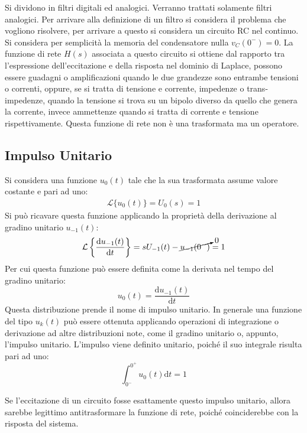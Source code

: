 \documentclass{article}
\newcommand{\df}{\mathrm{d}}
\numberwithin{equation}{subsection}
\begin{document}
Si dividono in filtri digitali ed analogici. Verranno trattati solamente filtri analogici.  
Per arrivare alla definizione di un filtro si considera il problema che vogliono risolvere, per arrivare a questo si considera un circuito RC nel continuo. 
Si considera per semplicità la memoria del condensatore nulla $v_C(0^-)=0$. 
La funzione di rete $H(s)$ associata a questo circuito si ottiene dal rapporto tra l'espressione dell'eccitazione e della risposta nel dominio di Laplace, possono essere 
guadagni o amplificazioni quando le due grandezze sono entrambe tensioni o correnti, oppure, se si tratta di tensione e corrente, impedenze o trans-impedenze, quando la tensione si trova su un bipolo diverso 
da quello che genera la corrente, invece ammettenze quando si tratta di corrente e tensione rispettivamente. 
Questa funzione di rete non è una trasformata ma un operatore. 

\subsection{Impulso Unitario}

Si considera una funzione $u_0(t)$ tale che la sua trasformata assume valore costante e pari ad uno:
\begin{gather}
    \mathcal{L}\{u_0(t)\}=U_0(s)=1
\end{gather}
Si può ricavare questa funzione applicando la proprietà della derivazione al gradino unitario $u_{-1}(t)$:
\begin{gather*}
    \mathcal{L}\left\{\displaystyle\frac{\df u_{-1}(t)}{\df t}\right\}=sU_{-1}(t)-\cancelto{0}{u_{-1}(0^-)}=1
\end{gather*}
Per cui questa funzione può essere definita come la derivata nel tempo del gradino unitario:
\begin{equation}
    u_0(t)=\displaystyle\frac{\df u_{-1}(t)}{\df t}
\end{equation}
Questa distribuzione prende il nome di impulso unitario. In generale una funzione del tipo $u_{k}(t)$ può essere ottenuta applicando operazioni di integrazione o derivazione 
ad altre distribuzioni note, come il gradino unitario o, appunto, l'impulso unitario. 
L'impulso viene definito unitario, poiché il suo integrale risulta pari ad uno:
\begin{equation}
    \displaystyle\int_{0^-}^{0^+}u_{0}(t)\df t=1
\end{equation}

Se l'eccitazione di un circuito fosse esattamente questo impulso unitario, allora sarebbe legittimo antitrasformare la funzione di rete, poiché coinciderebbe con la risposta 
del sistema. 
\end{document}
